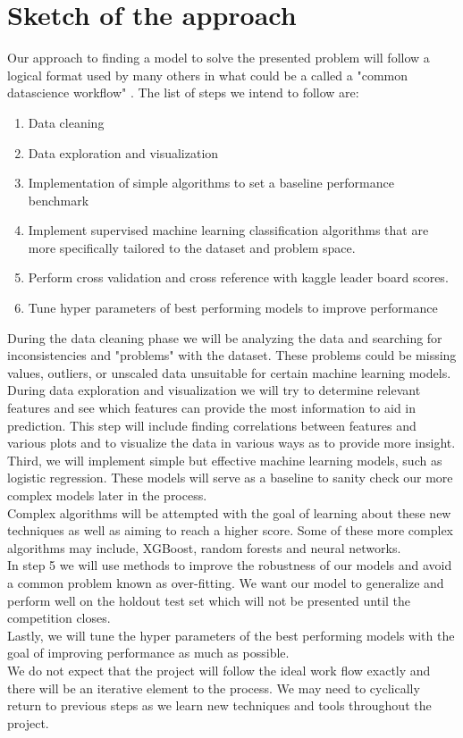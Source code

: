 \documentclass{llncs}
\begin{document}
\section{Sketch of the approach}
Our approach to finding a model to solve the presented problem will follow a logical format used by many others in what could be a called a "common datascience workflow" \cite{ref_url2}. The list of steps we intend to follow are:

\begin{enumerate}
\item Data cleaning
\item Data exploration and visualization
\item Implementation of simple algorithms to set a baseline performance benchmark
\item Implement supervised machine learning  classification algorithms that are more specifically tailored to the dataset and problem space.
\item Perform cross validation and cross reference with kaggle leader board scores. 
\item Tune hyper parameters of best performing models to improve performance
\end{enumerate}

During the data cleaning phase we will be analyzing the data and searching for inconsistencies and "problems" with the dataset. These problems could be missing values, outliers, or unscaled data unsuitable for certain machine learning models. \\
During data exploration and visualization we will try to determine relevant features and see which features can provide the most information to aid in prediction. This step will include finding correlations between features and various plots and to visualize the data in various ways as to provide more insight.
Third, we will implement simple but effective machine learning models, such as logistic regression. These models will serve as a baseline to sanity check our more complex models later in the process. \\
Complex algorithms will be attempted with the goal of learning about these new techniques as well as aiming to reach a higher score. Some of these more complex algorithms may include, XGBoost, random forests and neural networks. \\
In step 5 we will use methods to improve the robustness of our models and avoid a common problem known as over-fitting. We want our model to generalize and perform well on the holdout test set which will not be presented until the competition closes. \\
Lastly, we will tune the hyper parameters of the best performing models with the goal of improving performance as much as possible. \\
We do not expect that the project will follow the ideal work flow exactly and there will be an iterative element to the process. We may need to cyclically return to previous steps as we learn new techniques and tools throughout the project.
\end{document}
